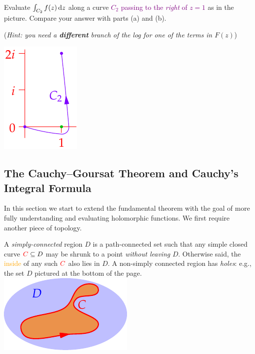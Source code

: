 \begin{exercises}
\begin{enumerate}
\begin{enumerate}
\begin{minipage}[t]{0.77\linewidth}
	    	\item Evaluate $\int_{C_2} f(z)\,{\mathrm{d} z}$ along a curve \textcolor{Purple}{$C_2$ passing to the \emph{right} of $z=1$} as in the picture. Compare your answer with parts (a) and (b).\par
	    	(\emph{Hint: you need a \textbf{different} branch of the log for one of the terms in $F(z)$})
			\end{minipage}
			\hfill
			\begin{minipage}[t]{0.22\linewidth}\vspace{0pt}
				\flushright\includegraphics{ftc-4}
			\end{minipage}
	  \end{enumerate}
		
	\end{enumerate}
\end{exercises}

\clearpage



\subsection[Cauchy--Goursat \& the Integral Formula]{The Cauchy--Goursat Theorem and Cauchy's Integral Formula}

In this section we start to extend the fundamental theorem with the goal of more fully understanding and evaluating holomorphic functions. We first require another piece of topology.

\begin{defn}[lower separated=false, sidebyside, sidebyside align=top seam, sidebyside gap=0pt, righthand width=0.27\linewidth]{}{}
	A \emph{simply-connected} region $D$ is a path-connected set such that any simple closed curve $\textcolor{red}{C}\subseteq D$ may be shrunk to a point \emph{without leaving $D$}. Otherwise said, the  \textcolor{orange}{inside} of any such $\textcolor{red}{C}$ also lies in $D$.\smallbreak
	A non-simply connected region has \emph{holes}: e.g., the set $D$ pictured at the bottom of the page.
	\tcblower
	\flushright\includegraphics[scale=0.95]{simplyconnected}
\end{defn}

